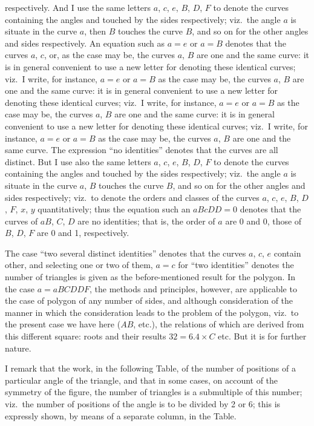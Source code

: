 \documentclass[11pt,a4paper]{book}
\begin{document}
respectively.  And I use the same letters $a$, $c$, $e$, $B$, $D$, $F$ to denote the curves containing the angles and touched by the sides respectively; viz.\ the angle $a$ is situate in the curve $a$, then $B$ touches the curve $B$, and so on for the other angles and sides respectively.  An equation such as $a = e$ or $a = B$ denotes that the curves $a$, $c$, or, as the case may be, the curves $a$, $B$ are one and the same curve: it is in general convenient to use a new letter for denoting these identical curves; viz.\ I write, for instance, $a = e$ or $a = B$ as the case may be, the curves $a$, $B$ are one and the same curve: it is in general convenient to use a new letter for denoting these identical curves; viz.\ I write, for instance, $a = e$ or $a = B$ as the case may be, the curves $a$, $B$ are one and the same curve: it is in general convenient to use a new letter for denoting these identical curves; viz.\ I write, for instance, $a = e$ or $a = B$ as the case may be, the curves $a$, $B$ are one and the same curve.  The expression ``no identities'' denotes that the curves are all distinct.  But I use also the same letters $a$, $c$, $e$, $B$, $D$, $F$ to denote the curves containing the angles and touched by the sides respectively; viz.\ the angle $a$ is situate in the curve $a$, $B$ touches the curve $B$, and so on for the other angles and sides respectively; viz.\ to denote the orders and classes of the curves $a$, $c$, $e$, $B$, $D$, $F$, $x$, $y$ quantitatively; thus the equation such an $aBcDD = 0$ denotes that the curves of $aB$, $C$, $D$ are no identities; that is, the order of $a$ are 0 and 0, those of $B$, $D$, $F$ are 0 and 1, respectively.

The case ``two several distinct identities'' denotes that the curves $a$, $c$, $e$ contain other, and selecting one or two of them, $a = c$ for ``two identities'' denotes the number of triangles is given as the before-mentioned result for the polygon. In the case $a = aBCDDF$, the methods and principles, however, are applicable to the case of polygon of any number of sides, and although consideration of the manner in which the consideration leads to the problem of the polygon, viz.\ to the present case we have here ($AB$, etc.), the relations of which are derived from this different square: roots and their results $32 = 6.4 \times C$ etc. But it is for further nature.

I remark that the work, in the following Table, of the number of positions of a particular angle of the triangle, and that in some cases, on account of the symmetry of the figure, the number of triangles is a submultiple of this number; viz.\ the number of positions of the angle is to be divided by 2 or 6; this is expressly shown, by means of a separate column, in the Table.
\end{document}
